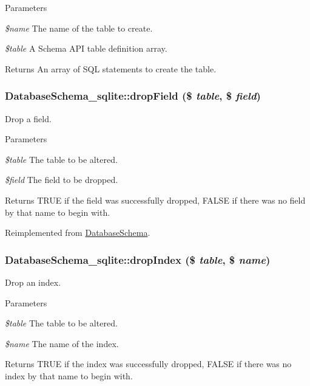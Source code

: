 \begin{DoxyParams}{Parameters}
\item[{\em \$name}]The name of the table to create. \item[{\em \$table}]A Schema API table definition array. \end{DoxyParams}
\begin{DoxyReturn}{Returns}
An array of SQL statements to create the table. 
\end{DoxyReturn}
\hypertarget{classDatabaseSchema__sqlite_a724d96040dfa30f34e5f0278525774bf}{
\subsubsection[{dropField}]{\setlength{\rightskip}{0pt plus 5cm}DatabaseSchema\_\-sqlite::dropField (\$ {\em table}, \/  \$ {\em field})}}
\label{classDatabaseSchema__sqlite_a724d96040dfa30f34e5f0278525774bf}
Drop a field.


\begin{DoxyParams}{Parameters}
\item[{\em \$table}]The table to be altered. \item[{\em \$field}]The field to be dropped.\end{DoxyParams}
\begin{DoxyReturn}{Returns}
TRUE if the field was successfully dropped, FALSE if there was no field by that name to begin with. 
\end{DoxyReturn}


Reimplemented from \hyperlink{classDatabaseSchema_a9eee3ae81e40bba206015a83450e1d56}{DatabaseSchema}.\hypertarget{classDatabaseSchema__sqlite_a876b9d643b03532cf0be81f6ea13ad9f}{
\subsubsection[{dropIndex}]{\setlength{\rightskip}{0pt plus 5cm}DatabaseSchema\_\-sqlite::dropIndex (\$ {\em table}, \/  \$ {\em name})}}
\label{classDatabaseSchema__sqlite_a876b9d643b03532cf0be81f6ea13ad9f}
Drop an index.


\begin{DoxyParams}{Parameters}
\item[{\em \$table}]The table to be altered. \item[{\em \$name}]The name of the index.\end{DoxyParams}
\begin{DoxyReturn}{Returns}
TRUE if the index was successfully dropped, FALSE if there was no index by that name to begin with. 
\end{DoxyReturn}


